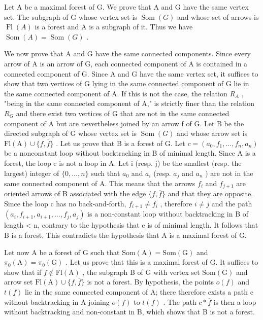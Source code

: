 Let A be a maximal forest of G. We prove that A and G have the same vertex set. The subgraph of G whose vertex set is \(\operatorname{Som}(G)\) and whose set of arrows is \(\operatorname{Fl}(A)\) is a forest and A is a subgraph of it. Thus we have \(\operatorname{Som}(A) = \operatorname{Som}(G)\) .

We now prove that A and G have the same connected components. Since every arrow of A is an arrow of G, each connected component of A is contained in a connected component of G. Since A and G have the same vertex set, it suffices to show that two vertices of G lying in the same connected component of G lie in the same connected component of A. If this is not the case, the relation \(R_{A}\) , "being in the same connected component of A," is strictly finer than the relation \(R_{G}\) and there exist two vertices of G that are not in the same connected component of A but are nevertheless joined by an arrow f of G. Let B be the directed subgraph of G whose vertex set is \(\operatorname{Som}(G)\) and whose arrow set is \(\mathrm{Fl(A)} \cup \{f, \overline{f}\}\) . Let us prove that B is a forest of G. Let \(c = (a_{0}, f_{1}, \ldots, f_{n}, a_{n})\) be a nonconstant loop without backtracking in B of minimal length. Since A is a forest, the loop c is not a loop in A. Let i (resp. j) be the smallest (resp. the largest) integer of \(\{0, \ldots, n\}\) such that \(a_{0}\) and \(a_{i}\) (resp. \(a_{j}\) and \(a_{n}\) ) are not in the same connected component of A. This means that the arrows \(f_{i}\) and \(f_{j+1}\) are oriented arrows of B associated with the edge \(\{f, \overline{f}\}\) and that they are opposite. Since the loop c has no back-and-forth, \(f_{i+1} \neq \overline{f_{i}}\) , therefore \(i \neq j\) and the path \((a_{i}, f_{i+1}, a_{i+1}, \ldots, f_{j}, a_{j})\) is a non-constant loop without backtracking in B of length < n, contrary to the hypothesis that c is of minimal length. It follows that B is a forest. This contradicts the hypothesis that A is a maximal forest of G.

Let now A be a forest of G such that \(\mathrm{Som}(\mathrm{A}) = \mathrm{Som}(\mathrm{G})\) and \(\pi_{0}(\mathrm{A}) = \pi_{0}(\mathrm{G})\) . Let us prove that this is a maximal forest of G. It suffices to show that if \(f \notin \mathrm{Fl}(\mathrm{A})\) , the subgraph B of G with vertex set \(\mathrm{Som}(\mathrm{G})\) and arrow set \(\mathrm{Fl}(\mathrm{A}) \cup \{f, \overline{f}\}\) is not a forest. By hypothesis, the points \(o(f)\) and \(t(f)\) lie in the same connected component of A; there therefore exists a path c without backtracking in A joining \(o(f)\) to \(t(f)\) . The path \(c * \overline{f}\) is then a loop without backtracking and non-constant in B, which shows that B is not a forest.

